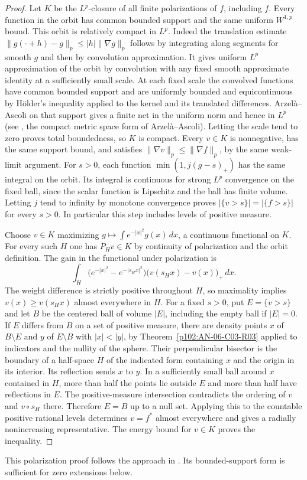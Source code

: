 \documentclass[11pt,oneside,openany]{book}
\theoremstyle{definition}
\theoremstyle{remark}
\begin{document}
\begin{proof}
Let \(K\) be the \(L^p\)-closure of all finite polarizations of \(f\),
including \(f\). Every function in the orbit has common bounded
support and the same uniform \(W^{1,p}\) bound. This orbit is
relatively compact in \(L^p\). Indeed the translation estimate
\(\|g(\cdot+h)-g\|_p\le |h|\|\nabla g\|_p\) follows by integrating
along segments for smooth \(g\) and then by convolution approximation.
It gives uniform \(L^p\) approximation of the orbit by convolution
with any fixed smooth approximate identity at a sufficiently small
scale. At each fixed scale the convolved functions have common
bounded support and are uniformly bounded and equicontinuous by
H\"older's inequality applied to the kernel and its translated
differences. Arzel\`a--Ascoli on that support gives a finite net in
the uniform norm and hence in \(L^p\) (see \cite{d10}, the compact
metric space form of Arzel\`a--Ascoli). Letting the scale tend to zero
proves total boundedness, so \(K\) is compact. Every \(v\in K\) is
nonnegative, has the same support bound, and satisfies
\(\|\nabla v\|_p\le\|\nabla f\|_p\), by the same weak-limit argument.
For \(s>0\), each function \(\min(1,j(g-s)_+)\) has the same integral
on the orbit. Its integral is continuous for strong \(L^p\) convergence
on the fixed ball, since the scalar function is Lipschitz and the
ball has finite volume. Letting \(j\) tend to infinity by monotone
convergence proves \(|\{v>s\}|=|\{f>s\}|\) for every \(s>0\).
In particular this step includes levels of positive measure.

Choose \(v\in K\) maximizing \(g\mapsto\int e^{-|x|^2}g(x)\,dx\),
a continuous functional on \(K\). For every such \(H\) one has
\(P_Hv\in K\) by continuity of polarization and the orbit definition.
The gain in the functional under polarization is
\[
 \int_H\bigl(e^{-|x|^2}-e^{-|s_Hx|^2}\bigr)
          \bigl(v(s_Hx)-v(x)\bigr)_+\,dx .
\]
The weight difference is strictly positive throughout \(H\), so
maximality implies \(v(x)\ge v(s_Hx)\) almost everywhere in \(H\).
For a fixed \(s>0\), put \(E=\{v>s\}\) and let \(B\) be the centered
ball of volume \(|E|\), including the empty ball if \(|E|=0\).
If \(E\) differs from \(B\) on a set of positive measure, there are
density points \(x\) of \(B\setminus E\) and \(y\) of \(E\setminus B\)
with \(|x|<|y|\), by Theorem~\ref{p102:AN-06-C03-R03} applied to
indicators and the nullity of the sphere. Their perpendicular
bisector is the boundary of a half-space \(H\) of the indicated form
containing \(x\) and the origin in its interior. Its reflection sends
\(x\) to \(y\). In a sufficiently small ball around \(x\) contained
in \(H\), more than half the points lie outside \(E\) and more than
half have reflections in \(E\). The positive-measure intersection
contradicts the ordering of \(v\) and \(v\circ s_H\) there. Therefore
\(E=B\) up to a null set. Applying this to the countable positive
rational levels determines \(v=f^\ast\) almost everywhere and
gives a radially nonincreasing representative. The energy bound
for \(v\in K\) proves the inequality.
\end{proof}
This polarization proof follows the approach in \cite{vanschaftingen}.
Its bounded-support form is sufficient for zero extensions below.
\end{document}
